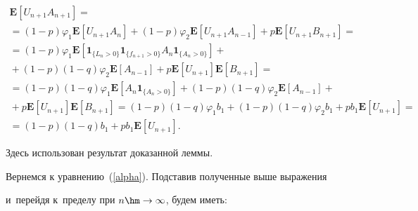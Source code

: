 \begin{multline*}

\mathbf{E}\left[U_{n+1} A_{n+1}\right]={}\\[1.5pt]

{}=

(1-p)\varphi_1\mathbf{E}\left[U_{n+1} A_n\right]+(1-p)\varphi_2\mathbf{E}

\left[U_{n+1} A_{n-1}\right]+p\mathbf{E}\left[U_{n+1} B_{n+1}\right]={}\\[1.5pt]

{}=(1-p)\varphi_1\mathbf{E}\left[\mathbf{1}_{\{L_n>0\}}

\mathbf{1}_{\{f_{n+1}>0\}}A_n\mathbf{1}_{\{A_n>0\}}\right]+{}\\[1.5pt]

{}+

(1-p)(1-q)\varphi_2\mathbf{E}\left[A_{n-1}\right]+

p\mathbf{E}\left[U_{n+1}\right]\mathbf{E}\left[B_{n+1}\right]={}\\[1.5pt]

{}=(1-p)(1-q)\varphi_1\mathbf{E}\left[A_n\mathbf{1}_{\{A_n>0\}}\right]+

(1-p)(1-q)\varphi_2\mathbf{E}\left[A_{n-1}\right]+{}

\\[1.5pt]

{}+

p\mathbf{E}\left[U_{n+1}\right]\mathbf{E}\left[B_{n+1}\right]=

(1-p)(1-q)\varphi_1 b_1+(1-p)(1-q)\varphi_2 b_1+pb_1\mathbf{E}

\left[U_{n+1}\right]={}\\[1.5pt]

{}=(1-p)(1-q)b_1+pb_1\mathbf{E}\left[U_{n+1}\right].

\end{multline*}

Здесь использован результат доказанной леммы.



Вернемся к уравнению~(\ref{alpha}). Подставив полученные выше выражения

и~перейдя к~пределу при $n\hm\to\infty$, будем иметь:



\pagebreak



\noindent

